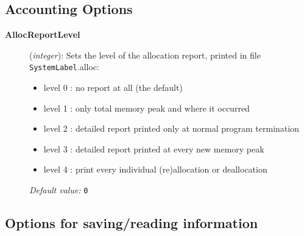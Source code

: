\documentclass[11pt]{article}
\begin{document}
\subsection{Accounting Options}
\begin{description}

\item[{\bf AllocReportLevel}] ({\it integer}): 
Sets the level of the allocation report, printed in file 
{\tt SystemLabel}.alloc:
\begin{itemize}
\item
  level 0 : no report at all (the default)
\item
  level 1 : only total memory peak and where it occurred
\item
  level 2 : detailed report printed only at 
            normal program termination
\item
  level 3 : detailed report printed at every new memory peak
\item
  level 4 : print every individual (re)allocation or deallocation
\end{itemize}

{\it Default value:} {\tt 0}

\end{description}

 


\vspace{5pt}
\subsection{Options for saving/reading information}
\end{document}
